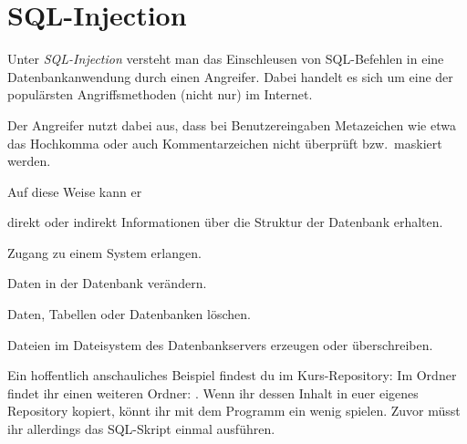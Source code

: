 \clearpage

\rehead[]{\textcolor{lightblue}{AvHG, Inf, My}}
\lohead[]{\textcolor{lightblue}{AvHG, Inf, My}}

\lstset{style=myJava}


\section{SQL-Injection}

Unter \emph{SQL-Injection} versteht man das Einschleusen von SQL-Befehlen
in eine Datenbankanwendung durch einen Angreifer. Dabei handelt es sich um eine
der populärsten Angriffsmethoden (nicht nur) im Internet.

Der Angreifer nutzt dabei aus, dass bei Benutzereingaben Metazeichen wie etwa
das Hochkomma oder auch Kommentarzeichen nicht überprüft bzw.\ maskiert werden.

Auf diese Weise kann er 

\begin{compactitem}
\item direkt oder indirekt Informationen über die Struktur der
Datenbank erhalten.
\item Zugang zu einem System erlangen.
\item Daten in der Datenbank verändern.
\item Daten, Tabellen oder Datenbanken löschen.
\item Dateien im Dateisystem des Datenbankservers erzeugen oder überschreiben.
\end{compactitem}

Ein hoffentlich anschauliches Beispiel findest du im Kurs-Repository: Im Ordner
\linebreak {} findet ihr einen weiteren Ordner:
. Wenn ihr dessen Inhalt in euer eigenes Repository
kopiert, könnt ihr mit dem Programm  ein wenig
\glqq spielen\grqq . Zuvor müsst ihr allerdings das SQL-Skript
 einmal ausführen.

